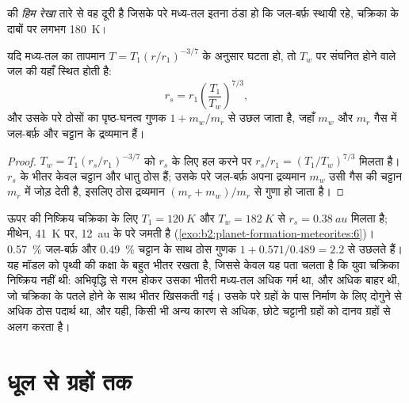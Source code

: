\begin{definition}[हिम रेखा]\label{def:b2:planet-formation-meteorites:snow-line}
 की \emph{हिम रेखा} तारे से वह दूरी है
जिसके परे मध्य-तल इतना ठंडा हो कि जल-बर्फ़
स्थायी रहे, चक्रिका के दाबों पर लगभग \qty{180}{K}।
\end{definition}

\begin{proposition}[निष्क्रिय चक्रिका की हिम रेखा]
\label{prop:b2:planet-formation-meteorites:snow-line}
यदि मध्य-तल का तापमान $T = T_1 (r/r_1)^{-3/7}$ के अनुसार घटता हो, तो
$T_w$ पर संघनित होने वाले जल की  यहाँ स्थित होती है:
\[
  r_s = r_1 \left(\frac{T_1}{T_w}\right)^{7/3},
\]
और उसके परे ठोसों का पृष्ठ-घनत्व गुणक $1 + m_w/m_r$ से उछल जाता है,
जहाँ $m_w$ और $m_r$ गैस में जल-बर्फ़ और चट्टान के द्रव्यमान हैं।
\end{proposition}

\begin{proof}
$T_w = T_1 (r_s/r_1)^{-3/7}$ को $r_s$ के लिए हल करने पर
$r_s/r_1 = (T_1/T_w)^{7/3}$ मिलता है। $r_s$ के भीतर केवल चट्टान और धातु ठोस हैं; उसके
परे जल-बर्फ़ अपना द्रव्यमान $m_w$ उसी गैस की चट्टान $m_r$ में जोड़ देती है, इसलिए
ठोस द्रव्यमान $(m_r + m_w)/m_r$ से गुणा हो जाता है।
\end{proof}

ऊपर की निष्क्रिय चक्रिका के लिए $T_1 = \qty{120}{K}$ और $T_w = \qty{182}{K}$ से
$r_s = \qty{0.38}{au}$ मिलता है; मीथेन, \qty{41}{K} पर, \qty{12}{au} के परे जमती है
(\cref{exo:b2:planet-formation-meteorites:6})। \qty{0.57}{\percent} जल-बर्फ़ और \qty{0.49}{\percent}
चट्टान के साथ ठोस गुणक $1 + 0.571/0.489 = 2.2$ से उछलते हैं। यह मॉडल
 को पृथ्वी की कक्षा के बहुत भीतर रखता है, जिससे केवल यह पता चलता है कि
युवा चक्रिका निष्क्रिय नहीं थी: अभिवृद्धि से गरम होकर उसका भीतरी मध्य-तल अधिक गर्म था,
और  अधिक बाहर थी, जो चक्रिका के पतले होने के साथ भीतर खिसकती गई। उसके
परे ग्रहों के पास निर्माण के लिए दोगुने से अधिक ठोस पदार्थ था, और
यही, किसी भी अन्य कारण से अधिक, छोटे चट्टानी ग्रहों को दानव ग्रहों से
अलग करता है।

\section{धूल से ग्रहों तक}

